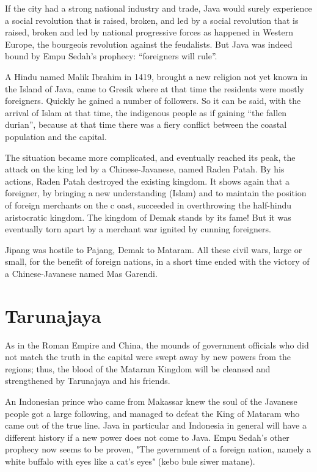 If the city had a strong national industry and trade, Java would surely experience a social revolution that is 
raised, broken, and led by a social revolution that is raised, broken and led by national progressive forces 
as happened in Western Europe, the bourgeois revolution against the feudalists.
But Java was indeed bound by Empu Sedah's prophecy: “foreigners will rule”.\nline

A Hindu named Malik Ibrahim in 1419, brought a new religion not yet known in the Island of 
Java, came to Gresik where at that time the residents were mostly foreigners. Quickly he 
gained a number of followers. So it can be said, with the arrival of Islam at that time, the 
indigenous people as if gaining “the fallen durian”, because at that time there was a fiery 
conflict between the coastal population and the capital.\nline

The situation became more complicated, and eventually reached its peak, 
the attack on the king led by a Chinese-Javanese, named Raden Patah. By his actions, 
Raden Patah destroyed the existing kingdom. It shows again that a foreigner, 
by bringing a new understanding (Islam) and to maintain the position of foreign merchants on the c
oast, succeeded in overthrowing the half-hindu aristocratic kingdom. The kingdom of 
Demak stands by its fame! But it was eventually torn apart by a merchant war ignited by cunning foreigners.\nline

Jipang was hostile to Pajang, Demak to Mataram. All these civil wars, 
large or small, for the benefit of foreign nations, in a short time ended with the victory 
of a Chinese-Javanese named Mas Garendi.\nline

\section{Tarunajaya}

As in the Roman Empire and China, the mounds of government officials who did not match 
the truth in the capital were swept away by new powers from the regions; thus, the blood 
of the Mataram Kingdom will be cleansed and strengthened by Tarunajaya and his friends.\nline

An Indonesian prince who came from Makassar knew the soul of the Javanese people got a large 
following, and managed to defeat the King of Mataram who came out of the true line. Java in 
particular and Indonesia in general will have a different history if a new power does not come 
to Java. Empu Sedah's other prophecy now seems to be proven, "The government of a foreign nation, 
namely a white buffalo with eyes like a cat's eyes" (kebo bule siwer matane).\nline

